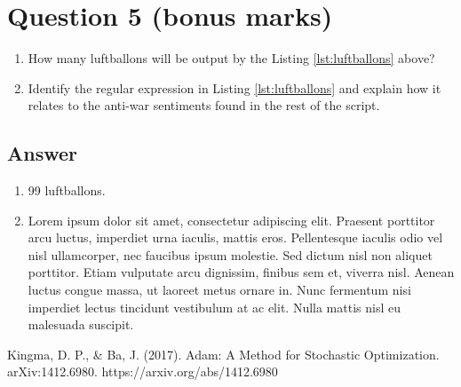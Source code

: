 \documentclass[
	12pt, %
]{../Template/fphw}
\begin{document}
\section*{Question 5 (bonus marks)}

\begin{problem}
	
	
	\begin{enumerate}
		\item How many luftballons will be output by the Listing \ref{lst:luftballons} above?
		\item Identify the regular expression in Listing \ref{lst:luftballons} and explain how it relates to the anti-war sentiments found in the rest of the script.
	\end{enumerate}

\end{problem}


\subsection*{Answer}

\begin{enumerate}
	\item 99 luftballons.
	\item Lorem ipsum dolor sit amet, consectetur adipiscing elit. Praesent porttitor arcu luctus, imperdiet urna iaculis, mattis eros. Pellentesque iaculis odio vel nisl ullamcorper, nec faucibus ipsum molestie. Sed dictum nisl non aliquet porttitor. Etiam vulputate arcu dignissim, finibus sem et, viverra nisl. Aenean luctus congue massa, ut laoreet metus ornare in. Nunc fermentum nisi imperdiet lectus tincidunt vestibulum at ac elit. Nulla mattis nisl eu malesuada suscipit.
\end{enumerate}

\begin{thebibliography}{9}
Kingma, D. P., \& Ba, J. (2017). Adam: A Method for Stochastic Optimization. arXiv:1412.6980. https://arxiv.org/abs/1412.6980

\end{thebibliography}
\end{document}

